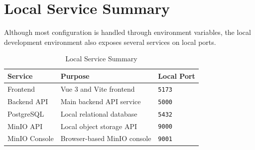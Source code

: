 \documentclass{article}
\begin{document}
\section{Local Service Summary}
Although most configuration is handled through environment variables, the local development environment also exposes several services on local ports.
\begin{table}[H]
    \centering
    \begin{tabular}{l l l}
        \toprule
        Service & Purpose & Local Port \\
        \midrule
        Frontend & Vue 3 and Vite frontend & \texttt{5173} \\
        Backend API & Main backend API service & \texttt{5000} \\
        PostgreSQL & Local relational database & \texttt{5432} \\
        MinIO API & Local object storage API & \texttt{9000} \\
        MinIO Console & Browser-based MinIO console & \texttt{9001} \\
        \bottomrule
    \end{tabular}
    \caption{Local Service Summary}
    \label{tab:local-services}
\end{table}
\end{document}
